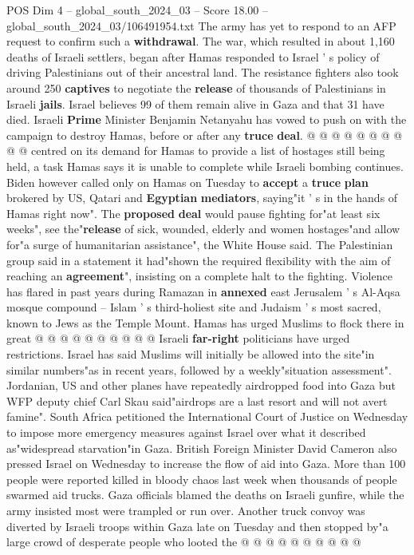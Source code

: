 \begin{textsample}{POS Dim 4 – global\_south\_2024\_03 – Score 18.00 – global\_south\_2024\_03/106491954.txt}
The army has yet to respond to an AFP request to confirm such a \textbf{withdrawal}.
The war, which resulted in about 1,160 deaths of Israeli settlers, began after Hamas responded to Israel ' s policy of driving Palestinians out of their ancestral land.
The resistance fighters also took around 250 \textbf{captives} to negotiate the \textbf{release} of thousands of Palestinians in Israeli \textbf{jails}.
Israel believes 99 of them remain alive in Gaza and that 31 have died.
Israeli \textbf{Prime} Minister Benjamin Netanyahu has vowed to push on with the campaign to destroy Hamas, before or after any \textbf{truce} \textbf{deal}. @ @ @ @ @ @ @ @ @ @ centred on its demand for Hamas to provide a list of hostages still being held, a task Hamas says it is unable to complete while Israeli bombing continues.
Biden however called only on Hamas on Tuesday to \textbf{accept} a \textbf{truce} \textbf{plan} brokered by US, Qatari and \textbf{Egyptian} \textbf{mediators}, saying"it ' s in the hands of Hamas right now".
The \textbf{proposed} \textbf{deal} would pause fighting for"at least six weeks", see the"\textbf{release} of sick, wounded, elderly and women hostages"and allow for"a surge of humanitarian assistance", the White House said.
The Palestinian group said in a statement it had"shown the required flexibility with the aim of reaching an \textbf{agreement}", insisting on a complete halt to the fighting.
Violence has flared in past years during Ramazan in \textbf{annexed} east Jerusalem ' s Al-Aqsa mosque compound -- Islam ' s third-holiest site and Judaism ' s most sacred, known to Jews as the Temple Mount.
Hamas has urged Muslims to flock there in great @ @ @ @ @ @ @ @ @ @ Israeli \textbf{far-right} politicians have urged restrictions.
Israel has said Muslims will initially be allowed into the site"in similar numbers"as in recent years, followed by a weekly"situation assessment".
Jordanian, US and other planes have repeatedly airdropped food into Gaza but WFP deputy chief Carl Skau said"airdrops are a last resort and will not avert famine".
South Africa petitioned the International Court of Justice on Wednesday to impose more emergency measures against Israel over what it described as"widespread starvation"in Gaza.
British Foreign Minister David Cameron also pressed Israel on Wednesday to increase the flow of aid into Gaza.
More than 100 people were reported killed in bloody chaos last week when thousands of people swarmed aid trucks.
Gaza officials blamed the deaths on Israeli gunfire, while the army insisted most were trampled or run over.
Another truck convoy was diverted by Israeli troops within Gaza late on Tuesday and then stopped by"a large crowd of desperate people who looted the @ @ @ @ @ @ @ @ @ @

\end{textsample}
